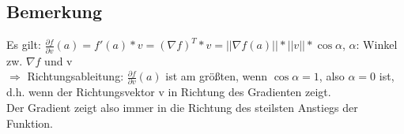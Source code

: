 \subsection{Bemerkung}
Es gilt: $\frac{\partial f}{\partial v}(a)=f'(a)*v=(\nabla f)^T*v = ||\nabla f(a)||*||v||*\cos \alpha$, $\alpha$: Winkel zw. $\nabla f$ und v\\
$\Rightarrow$ Richtungsableitung: $\frac{\partial f}{\partial v}(a)$ ist am größten, wenn $\cos \alpha = 1$, also $\alpha=0$  ist, d.h. wenn der Richtungsvektor v in Richtung des Gradienten zeigt.\\
Der Gradient zeigt also immer in die Richtung des steilsten Anstiegs der Funktion.
